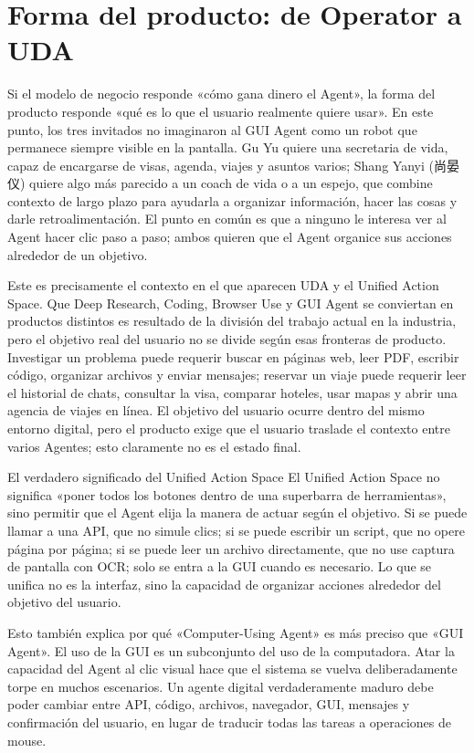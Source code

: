 \section{Forma del producto: de Operator a UDA}

Si el modelo de negocio responde «cómo gana dinero el Agent», la forma del producto responde «qué es lo que el usuario realmente quiere usar». En este punto, los tres invitados no imaginaron al GUI Agent como un robot que permanece siempre visible en la pantalla. Gu Yu quiere una secretaria de vida, capaz de encargarse de visas, agenda, viajes y asuntos varios; Shang Yanyi (尚晏仪) quiere algo más parecido a un coach de vida o a un espejo, que combine contexto de largo plazo para ayudarla a organizar información, hacer las cosas y darle retroalimentación. El punto en común es que a ninguno le interesa ver al Agent hacer clic paso a paso; ambos quieren que el Agent organice sus acciones alrededor de un objetivo.

Este es precisamente el contexto en el que aparecen UDA y el Unified Action Space. Que Deep Research, Coding, Browser Use y GUI Agent se conviertan en productos distintos es resultado de la división del trabajo actual en la industria, pero el objetivo real del usuario no se divide según esas fronteras de producto. Investigar un problema puede requerir buscar en páginas web, leer PDF, escribir código, organizar archivos y enviar mensajes; reservar un viaje puede requerir leer el historial de chats, consultar la visa, comparar hoteles, usar mapas y abrir una agencia de viajes en línea. El objetivo del usuario ocurre dentro del mismo entorno digital, pero el producto exige que el usuario traslade el contexto entre varios Agentes; esto claramente no es el estado final.

\begin{importantbox}{El verdadero significado del Unified Action Space}
El Unified Action Space no significa «poner todos los botones dentro de una superbarra de herramientas», sino permitir que el Agent elija la manera de actuar según el objetivo. Si se puede llamar a una API, que no simule clics; si se puede escribir un script, que no opere página por página; si se puede leer un archivo directamente, que no use captura de pantalla con OCR; solo se entra a la GUI cuando es necesario. Lo que se unifica no es la interfaz, sino la capacidad de organizar acciones alrededor del objetivo del usuario.
\end{importantbox}

Esto también explica por qué «Computer-Using Agent» es más preciso que «GUI Agent». El uso de la GUI es un subconjunto del uso de la computadora. Atar la capacidad del Agent al clic visual hace que el sistema se vuelva deliberadamente torpe en muchos escenarios. Un agente digital verdaderamente maduro debe poder cambiar entre API, código, archivos, navegador, GUI, mensajes y confirmación del usuario, en lugar de traducir todas las tareas a operaciones de mouse.

